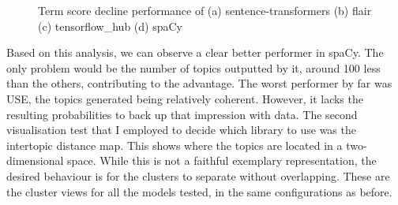 \documentclass[12pt,MSc,a4paper,oneside]{muthesis}
\begin{document}
\begin{figure}[h]
    \centering
    \caption{Term score decline performance of (a) sentence-transformers (b) flair (c) tensorflow\_hub (d) spaCy}
    \label{fig:foobar}
\end{figure}

Based on this analysis, we can observe a clear better performer in spaCy. The only problem would be the number of topics outputted by it, around 100 less than the others, contributing to the advantage. The worst performer by far was USE, the topics generated being relatively coherent. However, it lacks the resulting probabilities to back up that impression with data.
The second visualisation test that I employed to decide which library to use was the intertopic distance map. This shows where the topics are located in a two-dimensional space. While this is not a faithful exemplary representation, the desired behaviour is for the clusters to separate without overlapping. These are the cluster views for all the models tested, in the same configurations as before.
\end{document}

